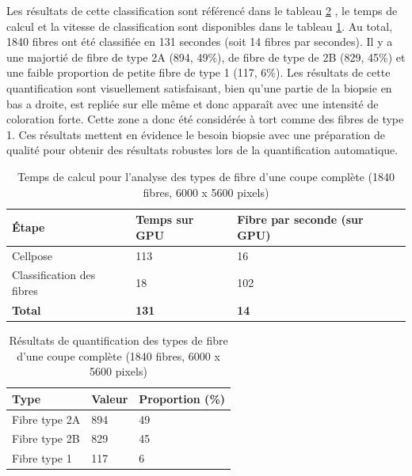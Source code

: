 Les résultats de cette classification sont référencé dans le tableau \ref{tab:atp_wsi_resultstable} , le temps de calcul et la vitesse de classification sont disponibles dans le tableau \ref{tab:atp_wsi_timetable}. Au total, 1840 fibres ont été classifiée en 131 secondes (soit 14 fibres par secondes). Il y a une majortié de fibre de type 2A (894, 49\%), de fibre de type de 2B (829, 45\%) et une faible proportion de petite fibre de type 1 (117, 6\%). Les résultats de cette quantification sont visuellement satisfaisant, bien qu'une partie de la biopsie en bas a droite, est repliée sur elle même et donc apparaît avec une intensité de coloration forte. Cette zone a donc été considérée à tort comme des fibres de type 1. Ces résultats mettent en évidence le besoin biopsie avec une préparation de qualité pour obtenir des résultats robustes lors de la quantification automatique.

\begin{table}[htbp]
\centering
\caption{Temps de calcul pour l'analyse des types de fibre d'une coupe complète (1840 fibres, 6000 x 5600 pixels)}
\label{tab:atp_wsi_timetable}
\begin{tabularx}{\textwidth}{|X|X|X|}
\hline
\textbf{Étape} & \textbf{Temps sur GPU} & \textbf{Fibre par seconde (sur GPU)} \\
\toprule
Cellpose & 113 & 16 \\
\hline
Classification des fibres & 18 & 102 \\
\hline
\textbf{Total} & \textbf{131} & \textbf{14} \\
\hline
\end{tabularx}
\end{table}
\begin{table}[htbp]
\centering
\caption{Résultats de quantification des types de fibre d'une coupe complète (1840 fibres, 6000 x 5600 pixels)}
\label{tab:atp_wsi_resultstable}
\begin{tabularx}{\textwidth}{|X|X|X|}
\hline
\textbf{Type} & \textbf{Valeur} & \textbf{Proportion (\%)} \\
\toprule
Fibre type 2A & 894 & 49 \\
\hline
Fibre type 2B & 829 & 45 \\
\hline
Fibre type 1 & 117 & 6 \\
\hline
\end{tabularx}
\end{table}


